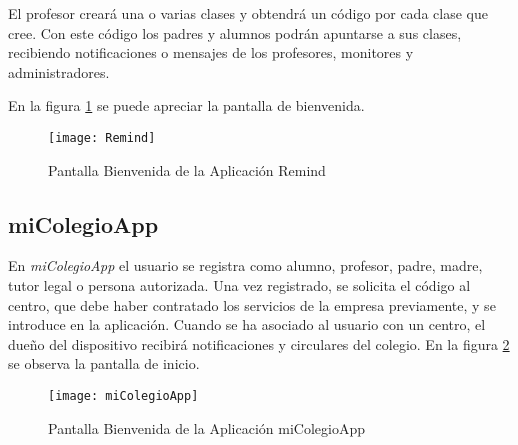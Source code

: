 	\bigskip
	El profesor creará una o varias clases y obtendrá un código por cada clase que cree. Con este código los padres y alumnos podrán apuntarse a sus clases, recibiendo notificaciones o mensajes de los profesores, monitores y administradores. 
	
	En la figura \ref{fig:Remind} se puede apreciar la pantalla de bienvenida.
	
	\begin{figure}[h !]
		\centering
		\texttt{[image: Remind]}
		\caption{Pantalla Bienvenida de la Aplicación Remind}
		\label{fig:Remind}
	\end{figure}
	
	\subsection{miColegioApp}
	En {\it miColegioApp}\cite{4:micolegioapp:online} el usuario se registra como alumno, profesor, padre, madre, tutor legal o persona autorizada. Una vez registrado, se solicita el código al centro, que debe haber contratado los servicios de la empresa previamente, y se introduce en la aplicación. Cuando se ha asociado al usuario con un centro, el dueño del dispositivo recibirá notificaciones y circulares del colegio.
	En la figura \ref{fig:miColegioApp} se observa la pantalla de inicio.
	
	\begin{figure}[h !]
		\centering
		\texttt{[image: miColegioApp]}
		\caption{Pantalla Bienvenida de la Aplicación miColegioApp}
		\label{fig:miColegioApp}
	\end{figure}